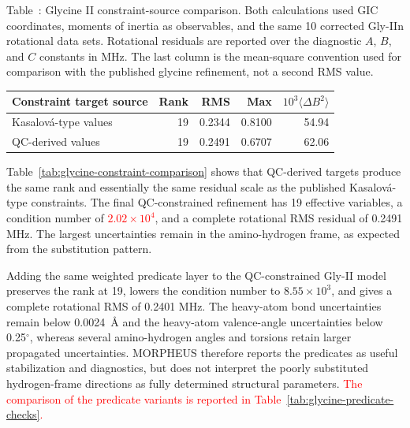 \documentclass[aip,jcp,reprint,longbibliography,floatfix]{revtex4-2}
\newcommand{\rev}[1]{\textcolor{red}{#1}}
\begin{document}
\begin{center}
\label{tab:glycine-constraint-comparison}
\parbox{0.94\linewidth}{\small\raggedright Table~\thetable: Glycine II
constraint-source comparison. Both calculations used GIC coordinates, moments
of inertia as observables, and the same 10 corrected Gly-IIn rotational data
sets. Rotational residuals are reported over the diagnostic $A$, $B$, and $C$
constants in MHz. The last column is the mean-square convention used for
comparison with the published glycine refinement, not a second RMS value.\par}
\smallskip
\small
\begin{tabular}{lrrrr}
\toprule
Constraint target source & Rank & RMS & Max & $10^3\langle\Delta B^2\rangle$ \\
\midrule
Kasalov{\'a}-type values & 19 & 0.2344 & 0.8100 & 54.94 \\
QC-derived values & 19 & 0.2491 & 0.6707 & 62.06 \\
\bottomrule
\end{tabular}
\end{center}

Table~\ref{tab:glycine-constraint-comparison} shows that QC-derived targets
produce the same rank and essentially the same residual scale as the published
Kasalov{\'a}-type constraints. The final QC-constrained refinement has 19
effective variables, a condition number of \rev{$2.02\times10^4$}, and a complete
rotational RMS residual of 0.2491 MHz. The largest uncertainties remain in the
amino-hydrogen frame, as expected from the substitution pattern.

Adding the same weighted predicate layer to the QC-constrained Gly-II model
preserves the rank at 19, lowers the condition number to $8.55\times10^3$, and
gives a complete rotational RMS of 0.2401 MHz. The heavy-atom bond
uncertainties remain below 0.0024~\AA{} and the heavy-atom valence-angle
uncertainties below 0.25$^\circ$, whereas several amino-hydrogen angles and
torsions retain larger propagated uncertainties. MORPHEUS therefore reports
the predicates as useful stabilization and diagnostics, but does not interpret
the poorly substituted hydrogen-frame directions as fully determined structural
parameters. \rev{The comparison of the predicate variants is reported in
Table~\ref{tab:glycine-predicate-checks}.}
\end{document}
